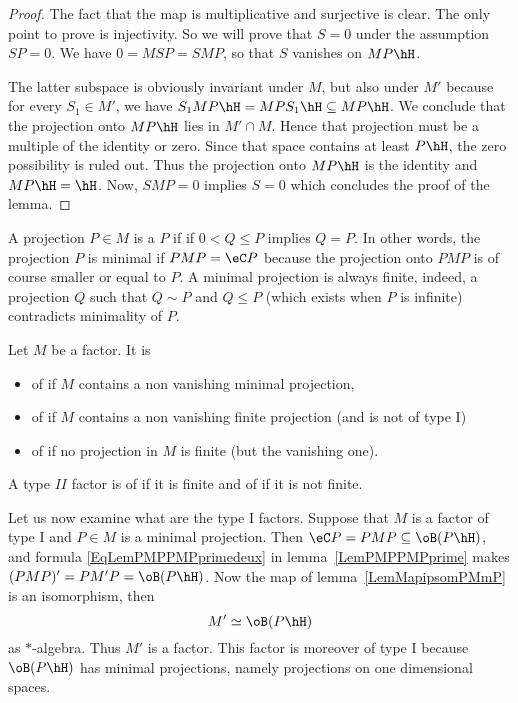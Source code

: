 \begin{proof}
	The fact that the map is multiplicative and surjective is clear. The only point to prove is injectivity. So we will prove that $S=0$ under the assumption $SP=0$. We have $0=MSP=SMP$, so that $S$ vanishes on $MP\hH$.

	The latter subspace is obviously invariant under $M$, but also under $M'$ because for every $S_1\in M'$, we have $S_1MP\hH=MPS_1\hH\subseteq MP\hH$. We conclude that the projection onto $MP\hH$ lies in $M'\cap M$. Hence that projection must be a multiple of the identity or zero. Since that space contains at least $P\hH$, the zero possibility is ruled out. Thus the projection onto $MP\hH$ is the identity and $MP\hH=\hH$. Now, $SMP=0$ implies $S=0$ which concludes the proof of the lemma.
\end{proof}

A projection $P\in M$ is a  $P$ if if $0<Q\leq P$ implies $Q=P$. In other words, the projection $P$ is minimal if $PMP=\eC P$ because the projection onto $PMP$ is of course smaller or equal to $P$. A minimal projection is always finite, indeed, a projection $Q$ such that $Q\sim P$ and $Q\leq P$ (which exists when $P$ is infinite) contradicts minimality of $P$.

\begin{definition}
	Let $M$ be a factor. It is
	\begin{itemize}
		\item of  if $M$ contains a non vanishing minimal projection,
		\item of  if $M$ contains a non vanishing finite projection (and is not of type I)
		\item of  if no projection in $M$ is finite (but the vanishing one).
	\end{itemize}
\end{definition}

A type $II$ factor is of  if it is finite and of  if it is not finite.

Let us now examine what are the type I factors.\label{PgtypeIonavu} Suppose that $M$ is a factor of type I and $P\in M$ is a minimal projection. Then $\eC P=PMP\subseteq\oB(P\hH)$, and formula \eqref{EqLemPMPPMPprimedeux} in lemma~\ref{LemPMPPMPprime} makes $(PMP)'=PM'P=\oB(P\hH)$. Now the map of lemma~\ref{LemMapipsomPMmP} is an isomorphism, then
\[
	M'\simeq\oB(P\hH)
\]
as $*$-algebra. Thus $M'$ is a factor. This factor is moreover of type I because $\oB(P\hH)$ has minimal projections, namely projections on one dimensional spaces.

